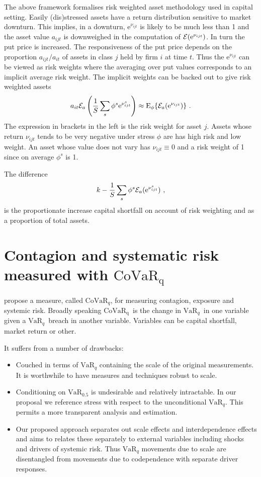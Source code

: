 \documentclass[authoryear]{elsarticle}
\newcommand{\e}{\mathrm{e}}
\newcommand{\Ex}{{\cal E}}
\newcommand{\bi}{\begin{itemize}}
\newcommand{\ei}{\end{itemize}}
\renewcommand{\i}{\item}
\newcommand{\var}{\ensuremath{\mathrm{VaR}}}
\newcommand{\covar}{\ensuremath{\mathrm{CoVaR}}}
\renewcommand{\v}{\ensuremath{\mathrm{v}_q}}
\newcommand{\be}[1]{\begin{equation}\label{#1}}
\newcommand{\ee}{\end{equation}}
\begin{document}
The above framework formalises risk weighted asset methodology  used in capital setting.   Easily (dis)stressed assets have a return distribution sensitive to market downturn.   This implies, in a downturn, $\e^{\nu_{ijt}}$ is likely to be much less than 1 and the asset value $a_{ijt}$ is downweighed in the computation of $\Ex(\e^{\nu_{ijt}})$.  In turn the put price is increased.  The responsiveness of the put price depends on the proportion $a_{ijt}/a_{it}$ of assets in class $j$ held by firm $i$ at time $t$.   Thus the $\e^{\nu_{ijt}}$ can be viewed  as risk weights where the averaging over put values corresponds  to an implicit average risk weight.   The implicit weights can be backed out to give risk weighted assets
\be{rwa}
a_{it}\Ex_a\left( \frac{1}{S}\sum_s\phi^s\e^{\nu_{ijt}^s}\right)\approx \Es\{\Ex_a(\e^{\nu_{ijt}})\} \ .
\ee
The expression in  brackets in the left is the risk weight for asset $j$.   Assets whose return $\nu_{ijt}$  tends to be very negative under stress $\phi$ are has high risk and low weight.  An asset whose value does not vary has $\nu_{ijt}\equiv 0$ and  a risk weight of 1 since on average $\phi^s$ is 1.

The difference
$$
k - \frac{1}{S}\sum_s\phi^s\Ex_a(\e^{\nu_{ijt}^s})\ ,
$$
is the proportionate increase capital shortfall on account of risk weighting and as a proportion of total assets.


 


\renewcommand{\c}{\ensuremath{\mathrm{CoVaR_q}}}
\renewcommand{\v}{\ensuremath{\mathrm{VaR}_q}}

\section{Contagion and systematic risk measured with \c}


 \cite{adrian2011covar}  propose a measure, called $\covar_q$, for measuring contagion, exposure and systemic risk.   Broadly speaking \c \ is the change in \v\   in one variable given a \v\  breach in another variable.  Variables can be capital shortfall, market return or other.
 
 
 It  suffers from a number of drawbacks:
\bi
\i Couched in terms of $\var_q$ containing the scale of the original measurements.   It is worthwhile to have measures and techniques robust to scale.
\i  Conditioning  on $\var_{0.5}$ is undesirable and relatively intractable.  In our proposal we reference stress with respect  to the unconditional $\var_q$.   This permits a more transparent analysis and estimation. 
\i  Our proposed approach  separates out scale effects and interdependence effects and aims to  relates these separately to external variables including shocks and drivers of systemic risk.   Thus $\var_q$ movements due to scale are disentangled from movements due to codependence with separate driver responses.
\ei
\end{document}
